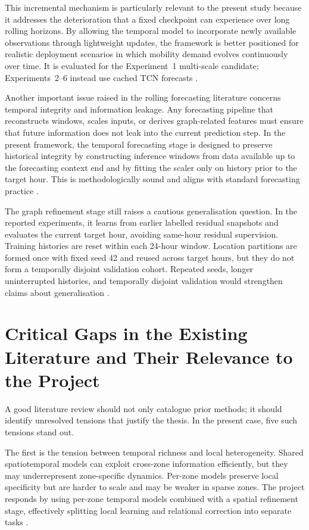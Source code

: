 \documentclass[12pt,a4paper]{report}
\begin{document}
This incremental mechanism is particularly relevant to the present study because it addresses the deterioration that a fixed checkpoint can experience over long rolling horizons. By allowing the temporal model to incorporate newly available observations through lightweight updates, the framework is better positioned for realistic deployment scenarios in which mobility demand evolves continuously over time. It is evaluated for the Experiment~1 multi-scale candidate; Experiments~2--6 instead use cached TCN forecasts \cite{cavalcante2024review}.

Another important issue raised in the rolling forecasting literature concerns temporal integrity and information leakage. Any forecasting pipeline that reconstructs windows, scales inputs, or derives graph-related features must ensure that future information does not leak into the current prediction step. In the present framework, the temporal forecasting stage is designed to preserve historical integrity by constructing inference windows from data available up to the forecasting context end and by fitting the scaler only on history prior to the target hour. This is methodologically sound and aligns with standard forecasting practice \cite{hewamalage2022pitfalls,cerqueira2020evaluating}.

The graph refinement stage still raises a cautious generalisation question. In the reported experiments, it learns from earlier labelled residual snapshots and evaluates the current target hour, avoiding same-hour residual supervision. Training histories are reset within each 24-hour window. Location partitions are formed once with fixed seed 42 and reused across target hours, but they do not form a temporally disjoint validation cohort. Repeated seeds, longer uninterrupted histories, and temporally disjoint validation would strengthen claims about generalisation \cite{hewamalage2022pitfalls,cerqueira2020evaluating}.

\section{Critical Gaps in the Existing Literature and Their Relevance to the Project}

A good literature review should not only catalogue prior methods; it should identify unresolved tensions that justify the thesis. In the present case, five such tensions stand out.

The first is the tension between temporal richness and local heterogeneity. Shared spatiotemporal models can exploit cross-zone information efficiently, but they may underrepresent zone-specific dynamics. Per-zone models preserve local specificity but are harder to scale and may be weaker in sparse zones. The project responds by using per-zone temporal models combined with a spatial refinement stage, effectively splitting local learning and relational correction into separate tasks \cite{lim2021survey,zhuang2022sparse}.
\end{document}
